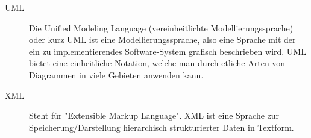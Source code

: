 \begin{description}
\item[UML]
Die Unified Modeling Language (vereinheitlichte Modellierungssprache) oder kurz UML ist eine Modellierungssprache, also eine Sprache mit der ein zu implementierendes Software-System grafisch beschrieben wird.
UML bietet eine einheitliche Notation, welche man durch etliche Arten von Diagrammen in viele Gebieten anwenden kann.

\item[XML]
Steht für "Extensible Markup Language". XML ist eine Sprache zur Speicherung/Darstellung hierarchisch strukturierter Daten in Textform.

\end{description}